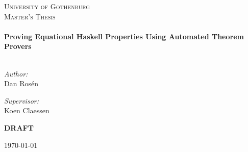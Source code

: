 \begin{titlepage}

\begin{center}



\vspace{4cm}

\textsc{\LARGE University of Gothenburg}\\[1.5cm]

\textsc{\Large Master's Thesis}\\[0.5cm]


\HRule \\[0.4cm]
{ \huge \bfseries Proving Equational Haskell Properties Using Automated Theorem Provers}\\[0.3cm]

\HRule \\[1.5cm]

\begin{minipage}{0.4\textwidth}
\begin{flushleft} \large
\emph{Author:}\\
Dan Rosén
\end{flushleft}
\end{minipage}
\begin{minipage}{0.4\textwidth}
\begin{flushright} \large
\emph{Supervisor:} \\
Koen Claessen
\end{flushright}
\end{minipage}

\vfill

{
\Large \textbf{DRAFT}

\vspace{2cm}

\large \today
}

\end{center}

\end{titlepage}